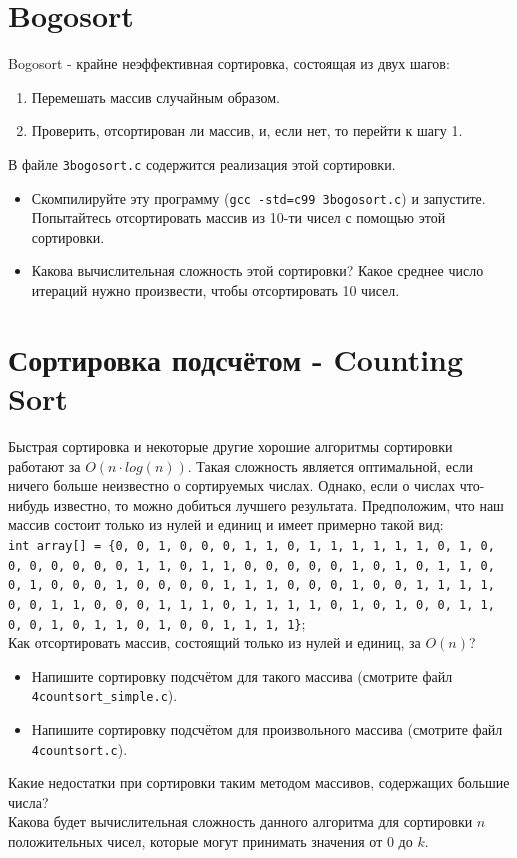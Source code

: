 \documentclass{article}
\begin{document}
\newpage
\section*{Bogosort}
Bogosort - крайне неэффективная сортировка, состоящая из двух шагов:
\begin{enumerate}
\item Перемешать массив случайным образом.
\item Проверить, отсортирован ли массив, и, если нет, то перейти к шагу 1.
\end{enumerate}
В файле \texttt{3bogosort.c} содержится реализация этой сортировки.
\begin{itemize}
\item Скомпилируйте эту программу (\texttt{gcc -std=c99 3bogosort.c}) и запустите. Попытайтесь отсортировать массив из 10-ти чисел с помощью этой сортировки.
\item Какова вычислительная сложность этой сортировки? Какое среднее число итераций нужно произвести, чтобы отсортировать 10 чисел.
\end{itemize}

\section*{Сортировка подсчётом - Counting Sort}
Быстрая сортировка и некоторые другие хорошие алгоритмы сортировки работают за $O(n \cdot log(n))$. Такая сложность является оптимальной, если ничего больше неизвестно о сортируемых числах. Однако, если о числах что-нибудь известно, то можно добиться лучшего результата. Предположим, что наш массив состоит только из нулей и единиц и имеет примерно такой вид: \\
\texttt{int array[] = \{0, 0, 1, 0, 0, 0, 1, 1, 0, 1, 1, 1, 1, 1, 1, 0, 1, 0, 0, 0, 0, 0, 0, 0, 1, 1, 0, 1, 1, 0, 0, 0, 0, 0, 1, 0, 1, 0, 1, 1, 0, 0, 1, 0, 0, 0, 1, 0, 0, 0, 0, 1, 1, 1, 0, 0, 0, 1, 0, 0, 1, 1, 1, 1, 0, 0, 1, 1, 0, 0, 0, 1, 1, 1, 0, 1, 1, 1, 1, 0, 1, 0, 1, 0, 0, 1, 1, 0, 0, 1, 0, 1, 1, 0, 1, 0, 0, 1, 1, 1, 1\}};\\
Как отсортировать массив, состоящий только из нулей и единиц, за $O(n)$?\\
\begin{itemize}
\item Напишите сортировку подсчётом для такого массива (смотрите файл \texttt{4countsort\_simple.c}).
\item Напишите сортировку подсчётом для произвольного массива (смотрите файл \texttt{4countsort.c}).
\end{itemize}
Какие недостатки при сортировки таким методом массивов, содержащих большие числа?\\
Какова будет вычислительная сложность данного алгоритма для сортировки $n$ положительных чисел, которые могут принимать значения от $0$ до $k$.
\end{document}
